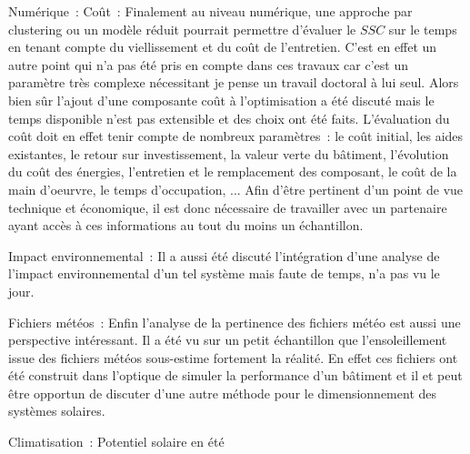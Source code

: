 Numérique~:
Coût~:
Finalement au niveau numérique, une approche par clustering ou un modèle réduit pourrait
permettre d’évaluer le $SSC$ sur le temps en tenant compte du viellissement et du coût
de l’entretien. C’est en effet un autre point qui n’a pas été pris en compte dans ces travaux
car c’est un paramètre très complexe nécessitant je pense un travail doctoral à lui seul.
Alors bien sûr l’ajout d’une composante coût à l’optimisation a été discuté mais le
temps disponible n’est pas extensible et des choix ont été faits.
L’évaluation du coût doit en effet tenir compte de nombreux paramètres~: le coût initial,
les aides existantes, le retour sur investissement, la valeur verte du bâtiment, l’évolution
du coût des énergies, l’entretien et le remplacement des composant, le coût de la main d’oeurvre,
le temps d’occupation, ...
Afin d’être pertinent d’un point de vue technique et économique, il est donc nécessaire
de travailler avec un partenaire ayant accès à ces informations au tout du moins un
échantillon.

Impact environnemental~:
Il a aussi été discuté l’intégration d’une analyse de l’impact environnemental
d’un tel système mais faute de temps, n’a pas vu le jour.

Fichiers météos~:
Enfin l’analyse de la pertinence des fichiers météo est aussi une perspective intéressant.
Il a été vu sur un petit échantillon que l’ensoleillement issue des fichiers météos
sous-estime fortement la réalité. En effet ces fichiers ont été construit dans l’optique
de simuler la performance d’un bâtiment et il et peut être opportun de discuter d’une
autre méthode pour le dimensionnement des systèmes solaires.


Climatisation~:
Potentiel solaire en été

